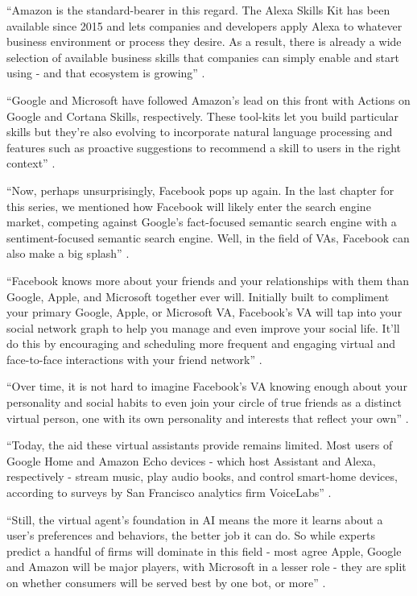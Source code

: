 ``Amazon is the standard-bearer in this regard. The Alexa Skills Kit has been available since 2015 and lets companies and developers apply Alexa to whatever business environment or process they desire. As a result, there is already a wide selection of available business skills that companies can simply enable and start using - and that ecosystem is growing'' \cite{Marvin2017them}.

``Google and Microsoft have followed Amazon's lead on this front with Actions on Google and Cortana Skills, respectively. These tool-kits let you build particular skills but they're also evolving to incorporate natural language processing and features such as proactive suggestions to recommend a skill to users in the right context'' \cite{Marvin2017them}.

``Now, perhaps unsurprisingly, Facebook pops up again. In the last chapter for this series, we mentioned how Facebook will likely enter the search engine market, competing against Google’s fact-focused semantic search engine with a sentiment-focused semantic search engine. Well, in the field of VAs, Facebook can also make a big splash'' \cite{Tal2015internet}.

``Facebook knows more about your friends and your relationships with them than Google, Apple, and Microsoft together ever will. Initially built to compliment your primary Google, Apple, or Microsoft VA, Facebook’s VA will tap into your social network graph to help you manage and even improve your social life. It’ll do this by encouraging and scheduling more frequent and engaging virtual and face-to-face interactions with your friend network'' \cite{Tal2015internet}.

``Over time, it is not hard to imagine Facebook's VA knowing enough about your personality and social habits to even join your circle of true friends as a distinct virtual person, one with its own personality and interests that reflect your own'' \cite{Tal2015internet}.

``Today, the aid these virtual assistants provide remains limited. Most users of Google Home and Amazon Echo devices - which host Assistant and Alexa, respectively - stream music, play audio books, and control smart-home devices, according to surveys by San Francisco analytics firm VoiceLabs'' \cite{Baron2017assistants}.

``Still, the virtual agent's foundation in AI means the more it learns about a user's preferences and behaviors, the better job it can do. So while experts predict a handful of firms will dominate in this field - most agree Apple, Google and Amazon will be major players, with Microsoft in a lesser role - they are split on whether consumers will be served best by one bot, or more'' \cite{Baron2017assistants}.

